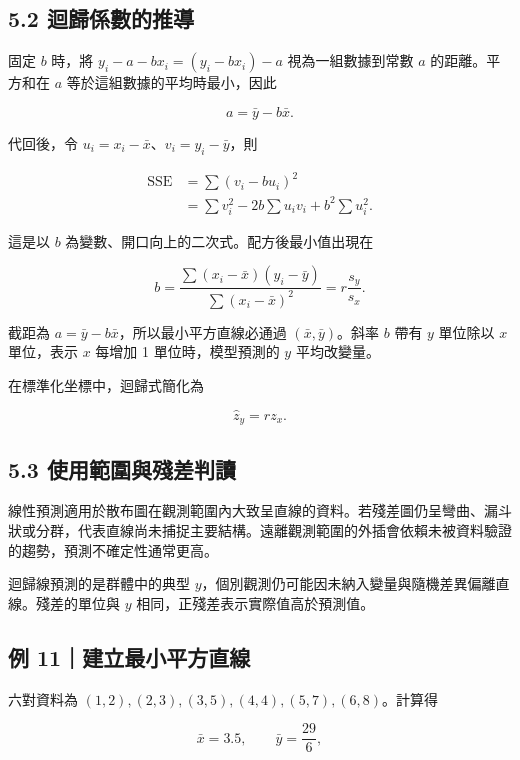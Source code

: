 \documentclass[11pt,a4paper]{article}
\begin{document}
\subsection{5.2 迴歸係數的推導}\label{ux8ff4ux6b78ux4fc2ux6578ux7684ux63a8ux5c0e}

固定 \(b\) 時，將 \(y_i-a-bx_i=(y_i-bx_i)-a\) 視為一組數據到常數 \(a\) 的距離。平方和在 \(a\) 等於這組數據的平均時最小，因此

\[
a=\bar y-b\bar x.
\]

代回後，令 \(u_i=x_i-\bar x\)、\(v_i=y_i-\bar y\)，則

\[
\begin{aligned}
\mathrm{SSE}
&=\sum(v_i-bu_i)^2\\
&=\sum v_i^2-2b\sum u_iv_i+b^2\sum u_i^2.
\end{aligned}
\]

這是以 \(b\) 為變數、開口向上的二次式。配方後最小值出現在

\[
\boxed{b=\frac{\sum(x_i-\bar x)(y_i-\bar y)}{\sum(x_i-\bar x)^2}}
=\boxed{r\frac{s_y}{s_x}}.
\]

截距為 \(\boxed{a=\bar y-b\bar x}\)，所以最小平方直線必通過 \((\bar x,\bar y)\)。斜率 \(b\) 帶有 \(y\) 單位除以 \(x\) 單位，表示 \(x\) 每增加 1 單位時，模型預測的 \(y\) 平均改變量。

在標準化坐標中，迴歸式簡化為

\[
\boxed{\hat z_y=r z_x}.
\]

\subsection{5.3 使用範圍與殘差判讀}\label{ux4f7fux7528ux7bc4ux570dux8207ux6b98ux5deeux5224ux8b80}

線性預測適用於散布圖在觀測範圍內大致呈直線的資料。若殘差圖仍呈彎曲、漏斗狀或分群，代表直線尚未捕捉主要結構。遠離觀測範圍的外插會依賴未被資料驗證的趨勢，預測不確定性通常更高。

迴歸線預測的是群體中的典型 \(y\)，個別觀測仍可能因未納入變量與隨機差異偏離直線。殘差的單位與 \(y\) 相同，正殘差表示實際值高於預測值。

\subsection{例 11｜建立最小平方直線}\label{ux4f8b-11ux5efaux7acbux6700ux5c0fux5e73ux65b9ux76f4ux7dda}

六對資料為 \((1,2),(2,3),(3,5),(4,4),(5,7),(6,8)\)。計算得

\[
\bar x=3.5,\qquad \bar y=\frac{29}{6},
\]
\end{document}

